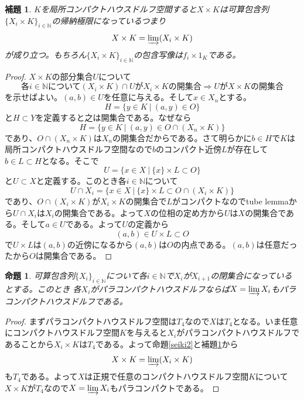 \documentclass[leqno]{jsarticle}
\newtheorem{prop}[thm]{命題}
\newtheorem{lem}[thm]{補題}
\newcommand{\To}{\Longrightarrow}
\newcommand{\nn}{\mathbb{N}}
\begin{document}
\begin{lem}\label{morita}
$K$を局所コンパクトハウスドルフ空間すると$X\times K$は可算包含列$\{X_i\times K\}_{i\in \nn}$の帰納極限になっているつまり
\[
X\times K=\varinjlim (X_i\times K)
\]
が成り立つ。もちろん$\{X_i\times K\}_{i\in \nn}$の包含写像は$f_i\times 1_K$である。
\end{lem}
\begin{proof}$X\times K$の部分集合$U$について
\[
\mbox{各$i\in \nn$について$(X_i\times K)\cap U$が$X_i\times K$の開集合}\To\mbox{$U$が$X\times K$の開集合}
\]
を示せばよい。$(a,b)\in U$を任意に与える。そして$x\in X_n$とする。
\[
H=\{y\in K\ |\ (a,y)\in O\}
\]
と$H\subset Y$を定義すると之は開集合である。なぜなら
\[
H=\{y\in K\ |\ (a,y)\in O\cap (X_n\times K)\}
\]
であり、$O\cap (X_n\times K)$は$X_n$の開集合だからである。さて明らかに$b\in H$で$K$は局所コンパクトハウスドルフ空間なので$b$のコンパクト近傍$L$が存在して$b\in L\subset H$となる。そこで
\[
U=\{x\in X\ |\ \{x\}\times L\subset O\}
\]
と$U\subset X$と定義する。このとき各$i\in \nn$について
\[
U\cap X_i=\{x\in X\ |\ \{x\}\times L\subset O\cap(X_i\times K)\}
\]
であり、$O\cap(X_i\times K)$が$X_i\times K$の開集合で$L$がコンパクトなのでtube lemmaから$U\cap X_i$は$X_i$の開集合である。よって$X$の位相の定め方から$U$は$X$の開集合である。そして$a\in U$である。よって$U$の定義から
\[
(a,b)\in U\times L\subset O
\]
で$U\times L$は$(a,b)$の近傍になるから$(a,b)$は$O$の内点である。$(a,b)$は任意だったから$O$は開集合である。
\end{proof}
\begin{prop}
可算包含列$\{X_i\}_{i\in \nn}$について各$i\in \nn$で$X_i$が$X_{i+1}$の閉集合になっているとする。このとき
各$X_i$がパラコンパクトハウスドルフならば$X=\varinjlim X_i$もパラコンパクトハウスドルフである。
\end{prop}
\begin{proof}
まずパラコンパクトハウスドルフ空間は$T_4$なので$X$は$T_4$となる。いま任意にコンパクトハウスドルフ空間$K$を与えると$X_i$がパラコンパクトハウスドルフであることから$X_i\times K$は$T_4$である。よって命題\ref{seiki2}と補題\ref{morita}から
\[
X\times K=\varinjlim (X_i\times K)
\]
も$T_4$である。よって$X$は正規で任意のコンパクトハウスドルフ空間$K$について$X\times K$が$T_4$なので$X=\varinjlim X_i$もパラコンパクトである。
\end{proof}
\end{document}
